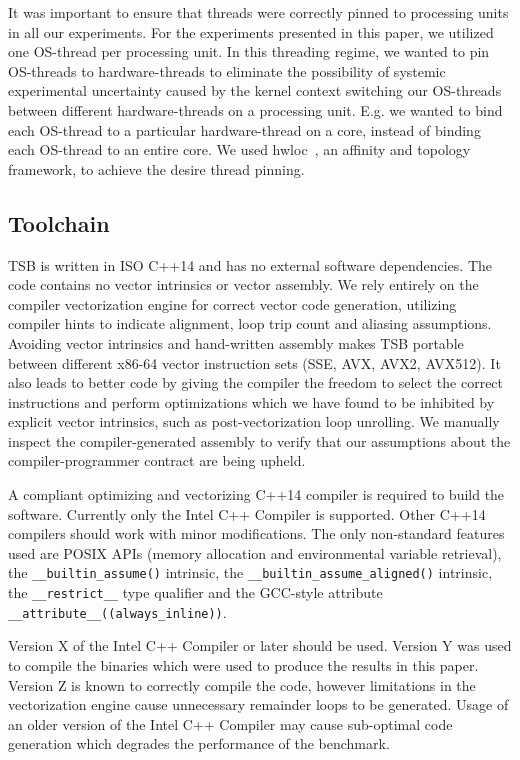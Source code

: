 \documentclass{sig-alternate-05-2015}
\begin{document}
It was important to ensure that threads were correctly pinned to processing
units in all our experiments. For the experiments presented in this paper, we
utilized one OS-thread per processing unit. In this threading regime, we wanted
to pin OS-threads to hardware-threads to eliminate the possibility of systemic
experimental uncertainty caused by the kernel context switching our OS-threads
between different hardware-threads on a processing unit. E.g. we wanted to bind
each OS-thread to a particular hardware-thread on a core, instead of binding
each OS-thread to an entire core. We used hwloc~\cite{}, an affinity and
topology framework, to achieve the desire thread pinning.

\subsection{Toolchain}
\label{sec:experimental_setup:toolchain}

TSB is written in ISO C++14 and has no external software dependencies. The code
contains no vector intrinsics or vector assembly. We rely entirely on the
compiler vectorization engine for correct vector code generation, utilizing
compiler hints to indicate alignment, loop trip count and aliasing assumptions.
Avoiding vector intrinsics and hand-written assembly makes TSB portable between
different x86-64 vector instruction sets (SSE, AVX, AVX2, AVX512). It also
leads to better code by giving the compiler the freedom to select the correct
instructions and perform optimizations which we have found to be inhibited by
explicit vector intrinsics, such as post-vectorization loop unrolling. We
manually inspect the compiler-generated assembly to verify that our assumptions
about the compiler-programmer contract are being upheld.

A compliant optimizing and vectorizing C++14 compiler is required to build the
software. Currently only the Intel C++ Compiler is supported. Other C++14
compilers should work with minor modifications. The only non-standard features
used are POSIX APIs (memory allocation and environmental variable retrieval),
the \lstinline{__builtin_assume()} intrinsic, the
\lstinline{__builtin_assume_aligned()} intrinsic, the \lstinline{__restrict__}
type qualifier and the GCC-style attribute
\lstinline{__attribute__((always_inline))}. 

Version X of the Intel C++ Compiler or later should be used. Version Y was used
to compile the binaries which were used to produce the results in this paper.
Version Z is known to correctly compile the code, however limitations in the
vectorization engine cause unnecessary remainder loops to be generated. Usage
of an older version of the Intel C++ Compiler may cause sub-optimal code
generation which degrades the performance of the benchmark.
\end{document}
